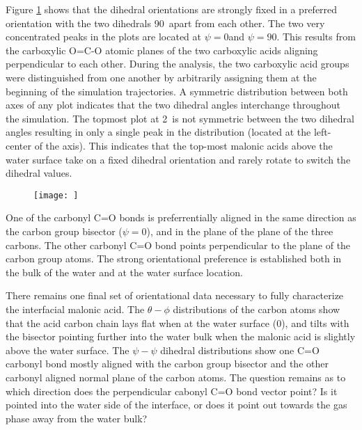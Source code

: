 Figure \ref{fig:carboxylic-psi-psi} shows that the dihedral orientations are strongly fixed in a preferred orientation with the two dihedrals 90\textdegree~apart from each other. The two very concentrated peaks in the plots are located at $\psi=0$\textdegree and $\psi=90$\textdegree. This results from the carboxylic O=C-O atomic planes of the two carboxylic acids aligning perpendicular to each other. During the analysis, the two carboxylic acid groups were distinguished from one another by arbitrarily assigning them at the beginning of the simulation trajectories. A symmetric distribution between both axes of any plot indicates that the two dihedral angles interchange throughout the simulation. The topmost plot at 2\angs~is not symmetric between the two dihedral angles resulting in only a single peak in the distribution (located at the left-center of the axis). This indicates that the top-most malonic acids above the water surface take on a fixed dihedral orientation and rarely rotate to switch the dihedral values.


\begin{figure}[h!]
	\begin{center}
		\texttt{[image: ]}
		\caption{}
		\label{fig:carboxylic-psi-psi}
	\end{center}
\end{figure}

One of the carbonyl C=O bonds is preferrentially aligned in the same direction as the carbon group bisector ($\psi=0$\textdegree), and in the plane of the plane of the three carbons. The other carbonyl C=O bond points perpendicular to the plane of the carbon group atoms. The strong orientational preference is established both in the bulk of the water and at the water surface location.

There remains one final set of orientational data necessary to fully characterize the interfacial malonic acid. The $\theta-\phi$ distributions of the carbon atoms show that the acid carbon chain lays flat when at the water surface (0\angs), and tilts with the bisector pointing further into the water bulk when the malonic acid is slightly above the water surface. The $\psi-\psi$ dihedral distributions show one C=O carbonyl bond mostly aligned with the carbon group bisector and the other carbonyl aligned normal plane of the carbon atoms. The question remains as to which direction does the perpendicular cabonyl C=O bond vector point? Is it pointed into the water side of the interface, or does it point out towards the gas phase away from the water bulk?

